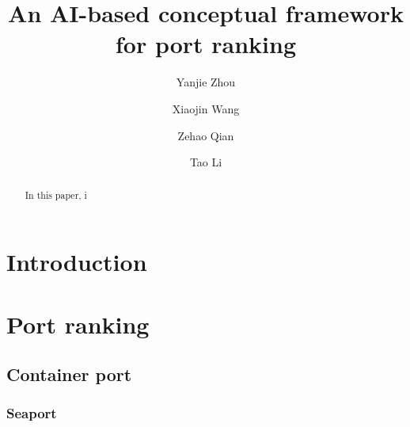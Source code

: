 \documentclass[preprint]{elsarticle}
\begin{document}
	\linenumbers
 \begin{frontmatter}
\title{An AI-based conceptual framework for port ranking}

\author[1]{Yanjie Zhou  } 
\author[1]{Xiaojin Wang  }  
\author[2]{Zehao Qian}  
\author[1]{Tao Li}  
 


\address[1]{School of Management, Zhengzhou University,  China, 315100, China}
\address[2]{Department of Nature Sciences, Durham University, UK} 

\begin{abstract}
In this paper, i 

\end{abstract}	
		\begin{keyword}
 	 
		\end{keyword}	
\end{frontmatter}
 




\section{Introduction}

 \section{Port ranking}

 \subsection{Container port}
 \subsubsection{Seaport}
\end{document}

